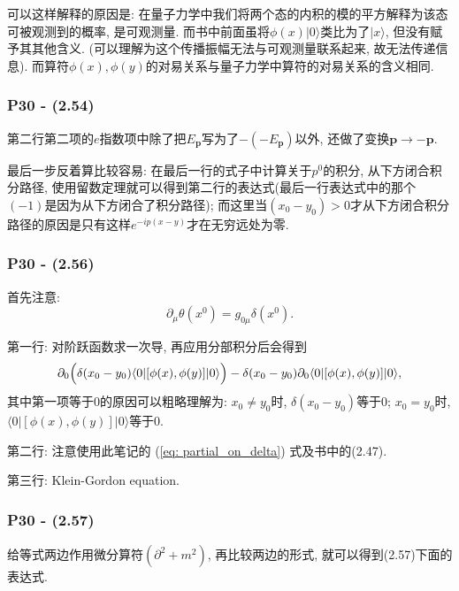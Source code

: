 \documentclass[cn,hazy,green,11pt,device=normal,chinesefont=founder]{elegantnote}
\begin{document}
\begin{remark}
  可以这样解释的原因是: 在量子力学中我们将两个态的内积的模的平方解释为该态可被观测到的概率, 是可观测量. 而书中前面虽将$\phi(x) |0\rangle$类比为了$|x\rangle$, 但没有赋予其其他含义. (可以理解为这个传播振幅无法与可观测量联系起来, 故无法传递信息). 而算符$\phi(x), \phi(y)$的对易关系与量子力学中算符的对易关系的含义相同. 
\end{remark}

\subsubsection{P30 - (2.54)}

第二行第二项的$e$指数项中除了把$E_\mathbf{p}$写为了$-(-E_\mathbf{p})$以外, 还做了变换$\mathbf{p} \rightarrow -\mathbf{p}$. 

最后一步反着算比较容易: 在最后一行的式子中计算关于$p^0$的积分, 从下方闭合积分路径, 使用留数定理就可以得到第二行的表达式(最后一行表达式中的那个$(-1)$是因为从下方闭合了积分路径); 而这里当$(x_0 - y_0)>0$才从下方闭合积分路径的原因是只有这样$e^{-ip(x - y)}$才在无穷远处为零. 

\subsubsection{P30 - (2.56)}

首先注意: 
\begin{equation}
  \partial_\mu \theta(x^0) = g_{0\mu} \delta(x^0) \label{eq: partial_on_delta}.
\end{equation}

第一行: 对阶跃函数求一次导, 再应用分部积分后会得到
\begin{equation}
  \partial_0 \Bigl(\delta(x_0 - y_0)\langle 0|[\phi(x), \phi(y)]|0\rangle \Bigr)-\delta(x_0 - y_0)\partial_0\langle 0|[\phi(x), \phi(y)]|0\rangle,
\end{equation}
其中第一项等于0的原因可以粗略理解为: $x_0 \neq y_0$时, $\delta(x_0 - y_0)$等于0; $x_0 = y_0$时, $\langle 0|[\phi(x), \phi(y)]|0\rangle$等于0. 

第二行: 注意使用此笔记的 (\ref{eq: partial_on_delta}) 式及书中的(2.47). 

第三行: Klein-Gordon equation. 

\subsubsection{P30 - (2.57)}

给等式两边作用微分算符$(\partial^2 + m^2)$, 再比较两边的形式, 就可以得到(2.57)下面的表达式. 
\end{document}
